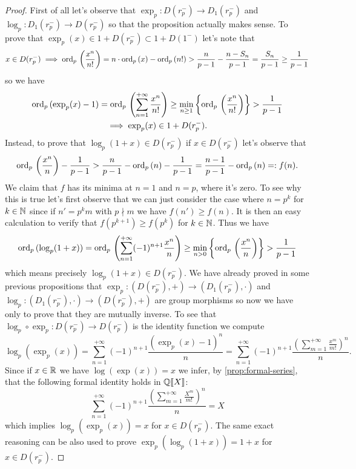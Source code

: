 		\begin{proof}
			First of all let's observe that $\exp_p\colon D(r_p^-) \to D_1(r_p^-)$ and $\log_p\colon D_1(r_p^-) \to D(r_p^-)$ so that the proposition actually makes sense. To prove that $\exp_p(x) \in 1 + D(r_p^-) \subset 1 + D(1^-)$ let's note that
			\[
				x \in D(r_p^-) \implies \textrm{ord}_p\,\left(\frac{x^n}{n!}\right) = n\cdot\textrm{ord}_p\,(x) - \textrm{ord}_p\,(n!) > \frac{n}{p-1} - \frac{n - S_n}{p-1} = \frac{S_n}{p-1} \geq \frac{1}{p-1}
			\]
			so we have
			\begin{gather*}
				\textrm{ord}_p\,(\exp_p(x) - 1) = \textrm{ord}_p\,\left( \sum_{n=1}^{+\infty} \frac{x^n}{n!} \right) \geq \min_{n \geq 1} \left\{\textrm{ord}_p\,\left(\frac{x^n}{n!}\right) \right\} > \frac{1}{p-1} \\
				\implies \exp_p(x) \in 1 + D(r_p^-).
			\end{gather*}
			Instead, to prove that $\log_p(1 + x) \in D(r_p^-)$ if $x \in D(r_p^-)$ let's observe that
			\[
				\textrm{ord}_p\,\left(\frac{x^n}{n}\right) - \frac{1}{p-1} > \frac{n}{p-1} - \textrm{ord}_p\,(n) - \frac{1}{p-1} = \frac{n-1}{p-1} - \textrm{ord}_p\,(n) =: f(n).
			\]
			We claim that $f$ has its minima at $n=1$ and $n=p$, where it's zero. To see why this is true let's first observe that we can just consider the case where $n = p^k$ for $k \in \mathbb{N}$ since if $n' = p^km$ with $p \nmid m$ we have $f(n') \geq f(n)$. It is then an easy calculation to verify that $f(p^{k+1}) \geq f(p^k)$ for $k \in \mathbb{N}$. Thus we have
			\[
				\textrm{ord}_p\,(\log_p(1 + x)) = \textrm{ord}_p\,\left(\sum_{n=1}^{+\infty} (-1)^{n+1}\frac{x^n}{n}\right) \geq \min_{n > 0} \left\{ \textrm{ord}_p\,\left(\frac{x^n}{n}\right) \right\} > \frac{1}{p-1}
			\]
			which means precisely $\log_p(1 + x) \in D(r_p^-)$. \newline
			We have already proved in some previous propositions that $\exp_p\colon (D(r_p^-),+) \to (D_1(r_p^-), \cdot)$ and $\log_p\colon (D_1(r_p^-), \cdot) \to (D(r_p^-), +)$ are group morphisms so now we have only to prove that they are mutually inverse.\newline
			To see that $\log_p \circ \exp_p\colon D(r_p^-) \to D(r_p^-)$ is the identity function we compute
			\[
				\log_p(\exp_p(x)) = \sum_{n=1}^{+\infty} (-1)^{n+1}\frac{(\exp_p(x) - 1)^n}{n} = \sum_{n=1}^{+\infty} (-1)^{n+1}\frac{\left(\sum_{m=1}^{+\infty} \frac{x^m}{m!}\right)^n}{n}.
			\]
			Since if $x \in \mathbb{R}$ we have $\log(\exp(x)) = x$ we infer, by \cref{prop:formal-series}, that the following formal identity  holds in $\mathbb{Q}\llbracket X\rrbracket$:
			\[
				\sum_{n=1}^{+\infty} (-1)^{n+1}\frac{\left(\sum_{m=1}^{+\infty} \frac{X^m}{m!}\right)^n}{n} = X
			\]
			which implies $\log_p(\exp_p(x)) = x$ for $x \in D(r_p^-)$. The same exact reasoning can be also used to prove $\exp_p(\log_p(1 + x)) = 1 + x$ for $x \in D(r_p^-)$.
		\end{proof}
